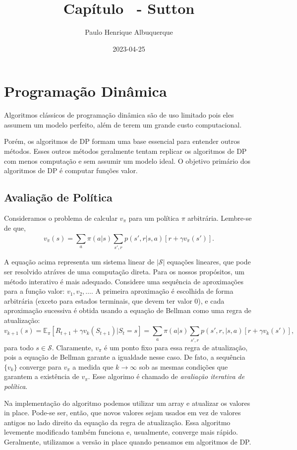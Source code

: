 \documentclass{article}
\title{Capítulo \cha\   - Sutton}
\author{Paulo Henrique Albuquerque}
\date{2023-04-25}
\begin{document}
\maketitle

\section{Programação Dinâmica}
Algoritmos clássicos de programação dinâmica são de uso limitado pois eles assumem um modelo perfeito, além de terem um grande custo computacional.

Porém, os algoritmos de DP formam uma base essencial para entender outros métodos. Esses outros métodos geralmente tentam replicar os algoritmos de DP com menos computação e sem assumir um modelo ideal. O objetivo primário dos algoritmos de DP é computar funções valor.

\subsection{Avaliação de Política}
Consideramos o problema de calcular $v_{\pi}$ para um política $\pi$ arbitrária. Lembre-se de que,
\[
  v_{\pi}(s)=\sum_{a}^{} \pi(a|s) \sum_{s',r}^{} p(s',r|s,a)[r+\gamma v_{\pi}(s')]
.\] 

A equação acima representa um sistema linear de $|\mathcal{S}|$ equações lineares, que pode ser resolvido atráves de uma computação direta. Para os nossos propósitos, um método interativo é mais adequado. Considere uma sequência de aproximações para a função valor: $v_1,v_2,\ldots$. A primeira aproximação é escolhida de forma arbitrária (exceto para estados terminais, que devem ter valor 0), e cada aproximação sucessiva é obtida usando a equação de Bellman como uma regra de atualização:
\[
  v_{k+1}(s)=\mathbb{E}_{\pi}[R_{t+1}+\gamma v_{k}(S_{t+1})|S_t=s]=\sum_{a}^{} \pi(a|s) \sum_{s',r}^{} p(s',r,|s,a)[r+\gamma v_{k}(s')],
\] 
para todo $s \in \mathcal{S}$. Claramente, $v_{\pi}$ é um ponto fixo para essa regra de atualização, pois a equação de Bellman garante a igualdade nesse caso. De fato, a sequência $\{v_{k}\}$ converge para $v_{\pi}$ a medida que  $k \to \infty$ sob as mesmas condições que garantem a existência de $v_{\pi}$. Esse algorimo é chamado de \textit{avaliação iterativa de política}.

Na implementação do algoritmo podemos utilizar um array e atualizar os valores in place. Pode-se ser, então, que novos valores sejam usados em vez de valores antigos no lado direito da equação da regra de atualização. Essa algoritmo levemente modificado também funciona e, usualmente, converge mais rápido. Geralmente, utilizamos a versão in place quando pensamos em algoritmos de DP.
\end{document}
